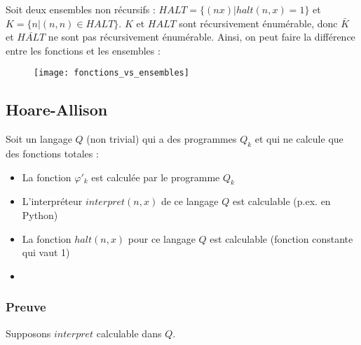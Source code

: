 Soit deux ensembles non récursifs : $HALT = \{(n x) | halt(n,x) = 1\}$ et $K = \{n | (n,n) \in HALT\}$. $K$ et $HALT$ sont récursivement énumérable, donc $\bar{K}$ et $\bar{HALT}$ ne sont pas récursivement énumérable.
Ainsi, on peut faire la différence entre les fonctions et les ensembles :

\begin{figure}[H]
    \centering
    \texttt{[image: fonctions\_vs\_ensembles]}
\end{figure}

\subsection{Hoare-Allison}

Soit un langage $Q$ (non trivial) qui a des programmes $Q_k$ et qui ne calcule que des fonctions totales :
\begin{itemize}
\item La fonction $\varphi'_k$ est calculée par le programme $Q_k$
\item L'interpréteur $interpret(n,x)$ de ce langage $Q$ est calculable (p.ex. en Python)
\item La fonction $halt(n,x)$ pour ce langage $Q$ est calculable (fonction constante qui vaut 1)
\item {}
\end{itemize}

\subsubsection{Preuve}

Supposons $interpret$ calculable dans $Q$.

